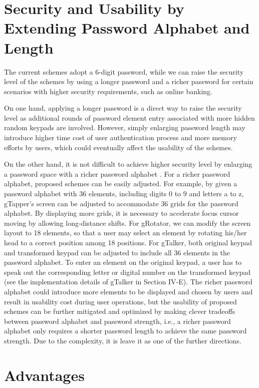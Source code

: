 \documentclass[12pt,a4paper,oneside]{report}
\begin{document}
\section{Security and Usability by Extending Password
Alphabet and Length}
The current schemes adopt a 6-digit password, while we
can raise the security level of the schemes by using a longer
password and a richer password for certain scenarios with
higher security requirements, such as online banking.
\par On one hand, applying a longer password is a direct way
to raise the security level as additional rounds of password
element entry associated with more hidden random keypads
are involved. However, simply enlarging password length may introduce higher time cost of user
authentication process and more memory efforts by users,
which could eventually affect the usability of the schemes.
\par 
On the other hand, it is not difficult to achieve higher security level by enlarging a password space with a richer password
alphabet . For a richer password alphabet, proposed schemes
can be easily adjusted. For example, by given a password
alphabet with 36 elements, including digits 0 to 9 and letters
a to z, gTapper’s screen can be adjusted to accommodate
36 grids for the password alphabet. By displaying more grids,
it is necessary to accelerate focus cursor moving by allowing
long-distance shifts. For gRotator, we can modify the screen
layout to 18 elements, so that a user may select an element by
rotating his/her head to a correct position among 18 positions.
For gTalker, both original keypad and transformed keypad
can be adjusted to include all 36 elements in the password
alphabet. To enter an element on the original keypad, a user has
to speak out the corresponding letter or digital number on the
transformed keypad (see the implementation details of gTalker
in Section IV-E). The richer password alphabet could introduce
more elements to be displayed and chosen by users and result
in usability cost during user operations, but the usability of proposed 
schemes can be further mitigated and optimized by making
clever tradeoffs between password alphabet and password
strength, i.e., a richer password alphabet only requires a shorter
password length to achieve the same password strength. Due
to the complexity, it is leave it as one of the further directions.



\section{Advantages}
\end{document}
